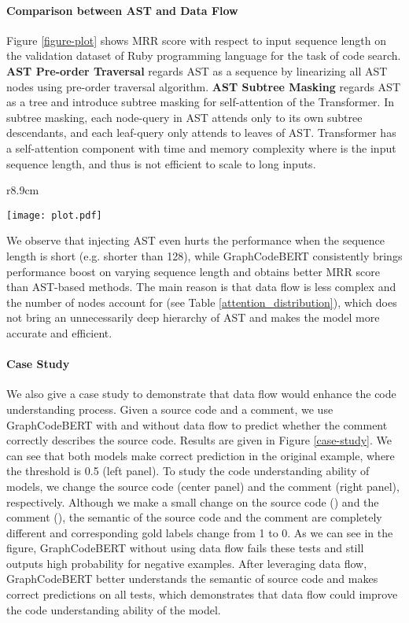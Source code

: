 \documentclass{article} \usepackage{iclr2021_conference,times}
\begin{document}
\paragraph{Comparison between AST and Data Flow}
Figure \ref{figure-plot} shows MRR score with respect to input sequence length on the validation dataset of Ruby programming language for the task of code search. 
{\bf AST Pre-order Traversal} regards AST as a sequence by linearizing all AST nodes using pre-order traversal algorithm. {\bf AST Subtree Masking} regards AST as a tree and introduce subtree masking \citep{nguyen2019tree} for self-attention of the Transformer. In subtree masking, 
each node-query in AST attends only to its own subtree descendants, and each leaf-query only attends to leaves of AST.
Transformer  has  a self-attention component with  time and memory complexity where  is the input sequence length, and thus is not efficient to scale to long inputs. 
\begin{wrapfigure}{r}{8.9cm}
\centering
\centerline{\texttt{[image: plot.pdf]}}
\caption{ MRR score on the validation dataset of Ruby for code search with varying length of input sequence.}
\label{figure-plot}
\vskip -0.2in
\end{wrapfigure}
We observe that injecting AST even hurts the performance when the sequence length is short (e.g. shorter than 128), while 
GraphCodeBERT consistently brings performance boost on varying sequence length and obtains better MRR score than AST-based methods. 
The main reason is that data flow is less complex and the number of nodes account for  (see Table \ref{attention_distribution}), which does not bring an unnecessarily deep hierarchy of AST and 
makes the model more accurate and efficient.


\paragraph{Case Study}
We also give a case study to demonstrate that data flow would enhance the code understanding process. Given a source code and a comment, we use GraphCodeBERT with and without data flow to predict whether the comment correctly describes the source code. Results are given in Figure \ref{case-study}. We can see that both models make correct prediction in the original example, where the threshold is 0.5 (left panel).
To study the code understanding ability of models, we change the source code (center panel) and the comment (right panel), respectively.
Although we make a small change on the source code () and the comment (), the semantic of the source code and the comment are completely different and  corresponding gold labels change from 1 to 0.
As we can see in the figure, GraphCodeBERT without using data flow fails these tests and still outputs high probability for negative examples. 
After leveraging data flow, GraphCodeBERT better understands the semantic of source code and makes correct predictions on all tests, which demonstrates that data flow could improve the code understanding ability of the model.
\end{document}
